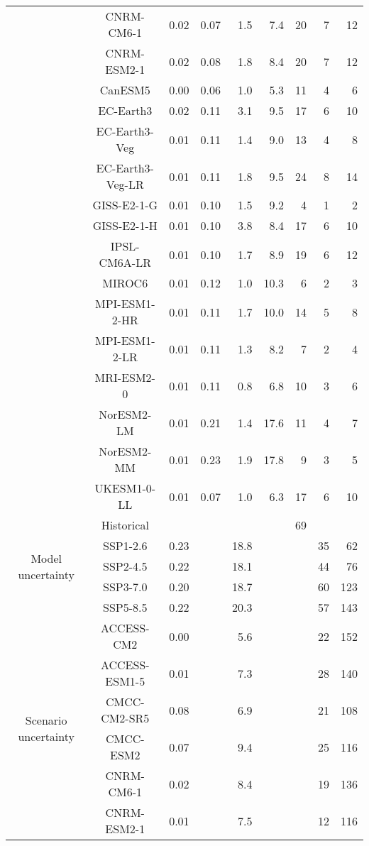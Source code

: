 \begin{table*}[t]
\begin{tabular}{c|c|rr|rr|rrr}
 & CNRM-CM6-1 & 0.02 & 0.07 & 1.5 & 7.4 & 20 & 7 & 12 \\
 & CNRM-ESM2-1 & 0.02 & 0.08 & 1.8 & 8.4 & 20 & 7 & 12 \\
 & CanESM5 & 0.00 & 0.06 & 1.0 & 5.3 & 11 & 4 & 6 \\
 & EC-Earth3 & 0.02 & 0.11 & 3.1 & 9.5 & 17 & 6 & 10 \\
 & EC-Earth3-Veg & 0.01 & 0.11 & 1.4 & 9.0 & 13 & 4 & 8 \\
 & EC-Earth3-Veg-LR & 0.01 & 0.11 & 1.8 & 9.5 & 24 & 8 & 14 \\
 & GISS-E2-1-G & 0.01 & 0.10 & 1.5 & 9.2 & 4 & 1 & 2 \\
 & GISS-E2-1-H & 0.01 & 0.10 & 3.8 & 8.4 & 17 & 6 & 10 \\
 & IPSL-CM6A-LR & 0.01 & 0.10 & 1.7 & 8.9 & 19 & 6 & 12 \\
 & MIROC6 & 0.01 & 0.12 & 1.0 & 10.3 & 6 & 2 & 3 \\
 & MPI-ESM1-2-HR & 0.01 & 0.11 & 1.7 & 10.0 & 14 & 5 & 8 \\
 & MPI-ESM1-2-LR & 0.01 & 0.11 & 1.3 & 8.2 & 7 & 2 & 4 \\
 & MRI-ESM2-0 & 0.01 & 0.11 & 0.8 & 6.8 & 10 & 3 & 6 \\
 & NorESM2-LM & 0.01 & 0.21 & 1.4 & 17.6 & 11 & 4 & 7 \\
 & NorESM2-MM & 0.01 & 0.23 & 1.9 & 17.8 & 9 & 3 & 5 \\
 & UKESM1-0-LL & 0.01 & 0.07 & 1.0 & 6.3 & 17 & 6 & 10 \\
\cline{1-9}
\multirow[c]{5}{*}{Model uncertainty} & Historical &  &  &  &  & 69 &  &  \\
 & SSP1-2.6 & 0.23 &  & 18.8 &  &  & 35 & 62 \\
 & SSP2-4.5 & 0.22 &  & 18.1 &  &  & 44 & 76 \\
 & SSP3-7.0 & 0.20 &  & 18.7 &  &  & 60 & 123 \\
 & SSP5-8.5 & 0.22 &  & 20.3 &  &  & 57 & 143 \\
\cline{1-9}
\multirow[c]{20}{*}{Scenario uncertainty} & ACCESS-CM2 & 0.00 &  & 5.6 &  &  & 22 & 152 \\
 & ACCESS-ESM1-5 & 0.01 &  & 7.3 &  &  & 28 & 140 \\
 & CMCC-CM2-SR5 & 0.08 &  & 6.9 &  &  & 21 & 108 \\
 & CMCC-ESM2 & 0.07 &  & 9.4 &  &  & 25 & 116 \\
 & CNRM-CM6-1 & 0.02 &  & 8.4 &  &  & 19 & 136 \\
 & CNRM-ESM2-1 & 0.01 &  & 7.5 &  &  & 12 & 116 \\

\end{tabular}
\end{table*}

